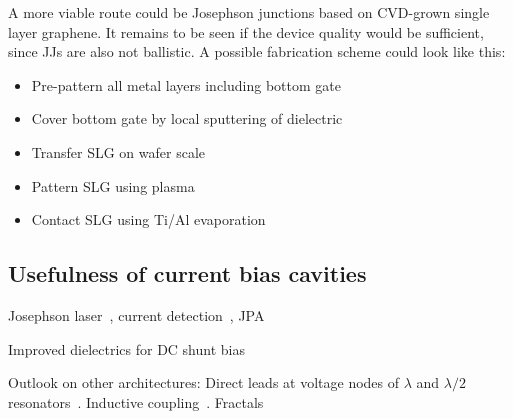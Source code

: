 A more viable route could be Josephson junctions based on CVD-grown single layer graphene.
%
It remains to be seen if the device quality would be sufficient, since  JJs are also not ballistic.
%
A possible fabrication scheme could look like this:
%
\begin{itemize}
	\item Pre-pattern all metal layers including bottom gate
	\item Cover bottom gate by local sputtering of dielectric
	\item Transfer SLG on wafer scale
	\item Pattern SLG using  plasma
	\item Contact SLG using Ti/Al evaporation
\end{itemize}


\subsection{Usefulness of current bias cavities}

Josephson laser~\cite{chenRealizationSingleCooperpairJosephson2014c,cassidyDemonstrationAcJosephson2017e}, current detection~\cite{kherKineticInductanceParametric2016,kherSuperconductingNonlinearKinetic2017}, JPA~\cite{hoeomWidebandLownoiseSuperconducting2012d}

Improved dielectrics for DC shunt bias~\cite{adamyanTunableSuperconductingMicrostrip2016}

Outlook on other architectures:
%
Direct leads at voltage nodes of $\lambda$ and $\lambda/2$ resonators~\cite{chenIntroductionDcBias2011a,liApplyingDirectCurrent2013}.
%
Inductive coupling~\cite{vissersFrequencytunableSuperconductingResonators2015b}.
%
Fractals~\cite{mahashabdeFastTunableHigh2020}


